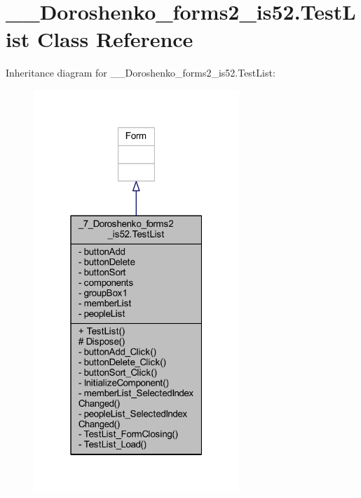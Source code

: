 \hypertarget{class__7___doroshenko__forms2__is52_1_1_test_list}{}\section{\+\_\+\_\+\+Doroshenko\+\_\+forms2\+\_\+is52.\+Test\+List Class Reference}
\label{class__7___doroshenko__forms2__is52_1_1_test_list}


Inheritance diagram for \+\_\+\_\+\+Doroshenko\+\_\+forms2\+\_\+is52.\+Test\+List\+:
\nopagebreak
\begin{figure}[H]
\begin{center}
\leavevmode
\includegraphics[width=220pt]{class__7___doroshenko__forms2__is52_1_1_test_list__inherit__graph}
\end{center}
\end{figure}


